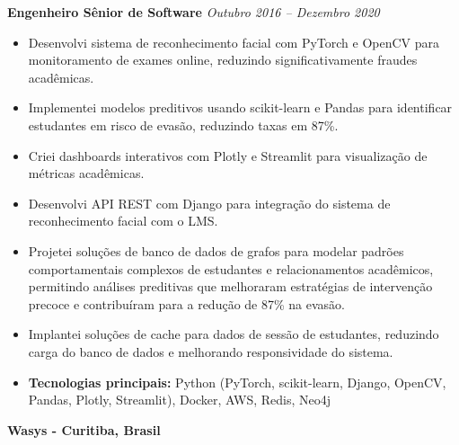 \documentclass[12pt,a4paper,sans]{moderncv}
\begin{document}
\textbf{Engenheiro Sênior de Software} \hfill \textit{Outubro 2016 -- Dezembro 2020}
\begin{itemize}
    \item Desenvolvi sistema de reconhecimento facial com PyTorch e OpenCV para monitoramento de exames online, reduzindo significativamente fraudes acadêmicas.
    \item Implementei modelos preditivos usando scikit-learn e Pandas para identificar estudantes em risco de evasão, reduzindo taxas em 87\%.
    \item Criei dashboards interativos com Plotly e Streamlit para visualização de métricas acadêmicas.
    \item Desenvolvi API REST com Django para integração do sistema de reconhecimento facial com o LMS.
    \item Projetei soluções de banco de dados de grafos para modelar padrões comportamentais complexos de estudantes e relacionamentos acadêmicos, permitindo análises preditivas que melhoraram estratégias de intervenção precoce e contribuíram para a redução de 87\% na evasão.
    \item Implantei soluções de cache para dados de sessão de estudantes, reduzindo carga do banco de dados e melhorando responsividade do sistema.
    \item \textbf{Tecnologias principais:} Python (PyTorch, scikit-learn, Django, OpenCV, Pandas, Plotly, Streamlit), Docker, AWS, Redis, Neo4j
\end{itemize}

\vspace{24pt}
\small{\textbf{Wasys - Curitiba, Brasil}}
\vspace{3pt}
\end{document}
